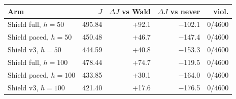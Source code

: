 \begin{tabular}{@{}l r r r r@{}}
\toprule
Arm & $J$ & $\Delta J$ vs Wald & $\Delta J$ vs never & viol. \\
\midrule
Shield full, $h=50$ & 495.84 & +92.1 & $-$102.1 & 0/4600 \\
Shield paced, $h=50$ & 450.48 & +46.7 & $-$147.4 & 0/4600 \\
Shield v3, $h=50$ & 444.59 & +40.8 & $-$153.3 & 0/4600 \\
Shield full, $h=100$ & 478.44 & +74.7 & $-$119.5 & 0/4600 \\
Shield paced, $h=100$ & 433.85 & +30.1 & $-$164.0 & 0/4600 \\
Shield v3, $h=100$ & 421.40 & +17.6 & $-$176.5 & 0/4600 \\
\bottomrule
\end{tabular}
